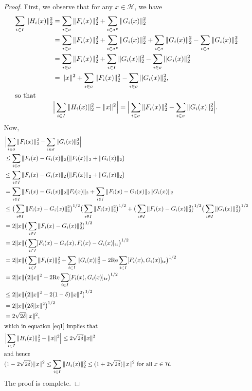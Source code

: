 \documentclass[reqno]{amsart}
\theoremstyle{plain}
\theoremstyle{remark}
\numberwithin{equation}{section}
\begin{document}
\begin{proof}
First, we observe that for any $x \in \mathcal{H}$, we have
\begin{align}\label{eq1}
\sum_{i \in I} \|H_i(x)\|_2^2
&= \sum_{i \in \sigma} \|F_i(x)\|_2^2 + \sum_{i \in \sigma^c} \|G_i(x)\|_2^2 \notag \\
&= \sum_{i \in \sigma} \|F_i(x)\|_2^2 + \sum_{i \in \sigma^c} \|G_i(x)\|_2^2+\sum_{i \in \sigma} \|G_i(x)\|_2^2-\sum_{i \in \sigma} \|G_i(x)\|_2^2  \notag \\
&= \sum_{i \in \sigma} \|F_i(x)\|_2^2 +\sum_{i \in I} \|G_i(x)\|_2^2-\sum_{i \in \sigma} \|G_i(x)\|_2^2  \notag \\
&=\|x\|^2+\sum_{i \in \sigma} \|F_i(x)\|_2^2 -\sum_{i \in \sigma} \|G_i(x)\|_2^2,  \notag \\
\intertext{so that}
&\Big|\sum_{i \in I} \|H_i(x)\|_2^2 - \|x\|^2\Big|=\Big|\sum_{i \in \sigma} \|F_i(x)\|_2^2 -\sum_{i \in \sigma} \|G_i(x)\|_2^2\Big|.
\end{align}
Now,
\begin{align*}
&\Big|\sum_{i \in \sigma} \|F_i(x)\|_2^2 -\sum_{i \in \sigma} \|G_i(x)\|_2^2\Big| \\
& \leq  \sum_{i \in \sigma} \| F_i(x)-G_i(x)\|_2 \big(\|F_i(x) \|_2+\|G_i(x)\|_2\big)\\
& \leq  \sum_{i \in I} \| F_i(x)-G_i(x)\|_2 \big(\|F_i(x) \|_2+\|G_i(x)\|_2\big)\\
& =  \sum_{i \in I} \| F_i(x)-G_i(x)\|_2 \|F_i(x) \|_2+\sum_{i \in I} \| F_i(x)-G_i(x)\|_2\|G_i(x)\|_2\\
&\leq  \big(\sum_{i \in I}\| F_i(x)-G_i(x)\|_2^2\big)^{1/2}\big(\sum_{i \in I}\| F_i(x)\|_2^2\big)^{1/2}+ \big(\sum_{i \in I}\| F_i(x)-G_i(x)\|_2^2\big)^{1/2}\big(\sum_{i \in I}\| G_i(x)\|_2^2\big)^{1/2} \\
&= 2 \|x\|\big(\sum_{i \in I}\| F_i(x)-G_i(x)\|_2^2\big)^{1/2}\\
&= 2 \|x\|\big(\sum_{i \in I}[F_i(x)-G_i(x), F_i(x)-G_i(x)]_{\text{tr}}\big)^{1/2}\\
&=2 \|x\|\big(\sum_{i \in I}\|F_i(x)\|_2^2 + \sum_{i \in I}\|G_i(x)\|_2^2- 2\text{Re} \sum_{i \in I} [ F_i(x), G_i(x) ]_{\text{tr}}\big)^{1/2}\\
&=2 \|x\|\big(2\|x\|^2- 2\text{Re} \sum_{i \in I} [ F_i(x), G_i(x) ]_{\text{tr}}\big)^{1/2}\\
& \leq 2 \|x\|\big(2\|x\|^2- 2(1 - \delta) \|x\|^2\big)^{1/2}\\
& = 2 \|x\|\big(2\delta\|x\|^2\big)^{1/2}\\
&= 2 \sqrt{2 \delta} \|x\|^2,\\
\intertext{which in equation \eqref{eq1} implies that}
&\Big|\sum_{i \in I} \|H_i(x)\|_2^2 - \|x\|^2\Big| \leq 2 \sqrt{2 \delta} \|x\|^2\\
\intertext{and hence}
&(1-2 \sqrt{2 \delta}) \|x\|^2 \leq \sum_{i \in I} \|H_i(x)\|_2^2  \leq (1+2 \sqrt{2 \delta}) \|x\|^2 \ \text{for all} \ x \in \mathcal{H}.
\end{align*}
The proof is complete.
\end{proof}
\end{document}
